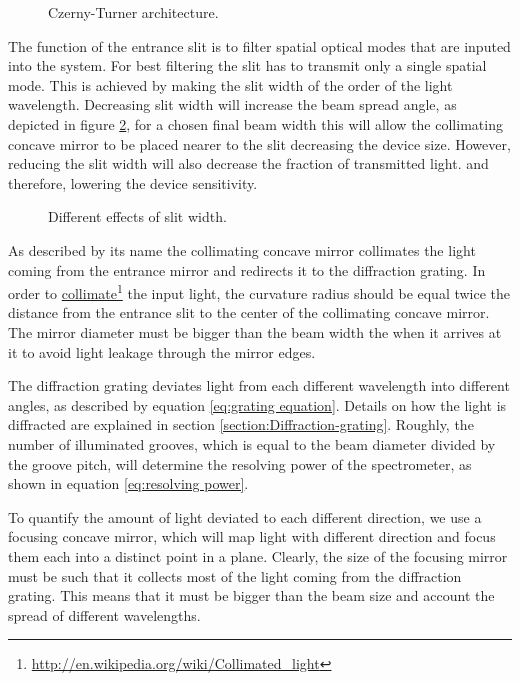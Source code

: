 \documentclass[12pt,twoside,english]{book}
\renewcommand{\~}{\perispomeni}%
\numberwithin{equation}{section}
\numberwithin{figure}{section}
\newcommand\fnurl[2]{%
 \href{#2}{#1}\footnote{\url{#2}}%
}
\begin{document}
%
\begin{figure}[h]
\centering
\caption{Czerny-Turner architecture.}
\label{fig:Czerny-Turner-architecture}
\end{figure}

The function of the entrance slit is to filter spatial optical modes that are inputed into the system. For best filtering the slit has to transmit only a single spatial mode. This is achieved by making the slit width of the order of the light wavelength. Decreasing slit width will increase the beam spread angle, as depicted in figure \ref{fig:different slits}, for a chosen final beam width this will allow the collimating concave mirror to be placed nearer to the slit decreasing the device size. However, reducing the slit width will also decrease the fraction of transmitted light. and therefore, lowering the device sensitivity.

%
\begin{figure}[h]
\centering

\caption{Different effects of slit width.}
\label{fig:different slits}
\end{figure}

As described by its name the collimating concave mirror collimates the light coming from the entrance mirror and redirects it to the diffraction grating. In order to \fnurl{collimate}{http://en.wikipedia.org/wiki/Collimated_light} the input light, the curvature radius should be equal twice the distance from the entrance slit to the center of the collimating concave mirror. The mirror diameter must be bigger than the beam width the when it arrives at it to avoid light leakage through the mirror edges.

The diffraction grating deviates light from each different wavelength into different angles, as described by equation \ref{eq:grating equation}. Details on how the light is diffracted are explained in section \ref{section:Diffraction-grating}. Roughly, the number of illuminated grooves, which is equal to the beam diameter divided by the groove pitch, will determine the resolving power of the spectrometer, as shown in equation \ref{eq:resolving power}.

To quantify the amount of light deviated to each different direction, we use a focusing concave mirror, which will map light with different direction and focus them each into a distinct point in a plane. Clearly, the size of the focusing mirror must be such that it collects most of the light coming from the diffraction grating. This means that it must be bigger than the beam size and account the spread of different wavelengths.
\end{document}
